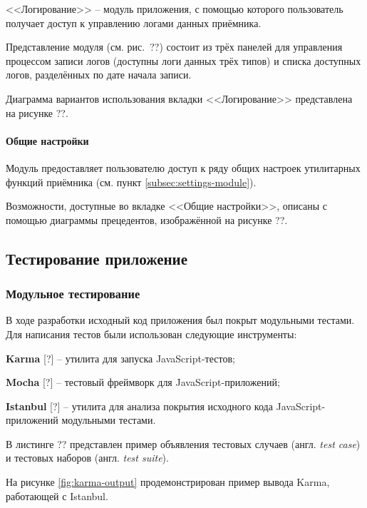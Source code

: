 <<Логирование>> -- модуль приложения, с помощью которого пользователь получает доступ к управлению логами данных приёмника.

Представление модуля (см. рис.~??) состоит из трёх панелей для управления процессом записи логов (доступны логи данных трёх типов) и списка доступных логов, разделённых по дате начала записи.

Диаграмма вариантов использования вкладки <<Логирование>> представлена на рисунке ??.

\paragraph{Общие настройки}

Модуль предоставляет пользователю доступ к ряду общих настроек  утилитарных функций приёмника (см. пункт \ref{subsec:settings-module}).

Возможности, доступные во вкладке <<Общие настройки>>, описаны с помощью диаграммы прецедентов, изображённой на рисунке ??.



\subsection{Тестирование приложение}


\subsubsection{Модульное тестирование}

В ходе разработки исходный код приложения был покрыт модульными тестами. Для написания тестов были использован следующие инструменты:
\begin{dashitemize}
  \item \textbf{Karma} [?] -- утилита для запуска JavaScript-тестов;
  \item \textbf{Mocha} [?] -- тестовый фреймворк для JavaScript-приложений;
  \item \textbf{Istanbul} [?] -- утилита для анализа покрытия исходного кода JavaScript-приложений модульными тестами.
\end{dashitemize}

В листинге ?? представлен пример объявления тестовых случаев (англ. \emph{test case}) и тестовых наборов (англ. \emph{test suite}).

{\color{gray}{*listing*}}

На рисунке \ref{fig:karma-output} продемонстрирован пример вывода Karma, работающей с Istanbul.


